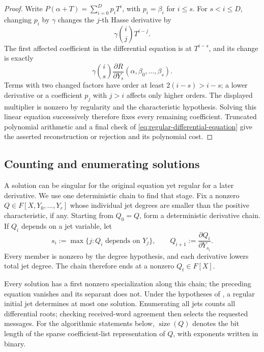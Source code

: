 \documentclass[11pt,letterpaper]{article}
\theoremstyle{definition}
\begin{document}
\begin{proof}
Write $P(\alpha+T)=\sum_{i=0}^Dp_iT^i$, with $p_i=\beta_i$ for
$i\le s$. For $s<i\le D$, changing $p_i$ by $\gamma$ changes the
$j$-th Hasse derivative by
\begin{equation}
 \gamma\binom ijT^{i-j}.
 \label{eq:hasse-lift-perturbation}
\end{equation}
The first affected coefficient in the differential equation is at
$T^{i-s}$, and its change is exactly
\begin{equation}
 \gamma\binom is\frac{\partial R}{\partial Y_s}
 (\alpha,\beta_0,\ldots,\beta_s).
 \label{eq:unique-lift-coefficient}
\end{equation}
Terms with two changed factors have order at least $2(i-s)>i-s$;
a lower derivative or a coefficient $p_j$ with $j>i$ affects only
higher orders. The displayed multiplier is nonzero by regularity and
the characteristic hypothesis. Solving this linear equation successively
therefore fixes every remaining coefficient. Truncated polynomial
arithmetic and a final check of \eqref{eq:regular-differential-equation}
give the asserted reconstruction or rejection and its polynomial cost.
\end{proof}

\subsection{Counting and enumerating solutions}

A solution can be singular for the original equation yet regular for a
later derivative. We use one deterministic chain to find that stage.
Fix a nonzero $Q\in F[X,Y_0,\ldots,Y_r]$ whose individual jet degrees
are smaller than the positive characteristic, if any.
Starting from $Q_0=Q$, form a deterministic derivative chain. If $Q_i$
depends on a jet variable, let
\begin{equation}
  s_i:=\max\{j:Q_i\text{ depends on }Y_j\},
  \qquad
  Q_{i+1}:=\frac{\partial Q_i}{\partial Y_{s_i}}.
  \label{eq:root-derivative-chain}
\end{equation}
Every member is nonzero by the degree hypothesis, and each derivative
lowers total jet degree. The chain therefore ends at a nonzero
$Q_t\in F[X]$.

Every solution has a first nonzero specialization along this chain;
the preceding equation vanishes and its separant does not.
Under the hypotheses of , a regular initial
jet determines at most one solution. Enumerating all jets counts all
differential roots; checking received-word agreement then selects the
requested messages.
 For the algorithmic statements below, \(\operatorname{size}(Q)\) denotes the bit length of the sparse
coefficient-list representation of \(Q\), with exponents written in binary.
\end{document}
